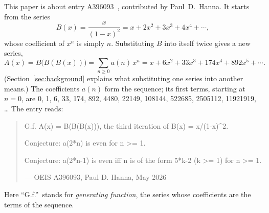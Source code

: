 \documentclass[11pt,a4paper]{article}
\theoremstyle{definition}
\theoremstyle{remark}
\begin{document}
This paper is about entry A396093~\cite{oeis}, contributed by Paul~D.~Hanna. It starts from the series
\[
B(x)=\frac{x}{(1-x)^2}=x+2x^2+3x^3+4x^4+\cdots,
\]
whose coefficient of $x^n$ is simply $n$. Substituting $B$ into itself twice gives a new series,
\[
A(x)=B\bigl(B(B(x))\bigr)=\sum_{n\ge0}a(n)\,x^n=x+6x^2+33x^3+174x^4+892x^5+\cdots .
\]
(Section~\ref{sec:background} explains what substituting one series into another means.) The coefficients $a(n)$ form
the sequence; its first terms, starting at $n=0$, are 0, 1, 6, 33, 174, 892, 4480, 22149, 108144, 522685, 2505112, 11921919, \dots{} The entry reads:
\begin{quote}\small\ttfamily\raggedright G.f. A(x) = B(B(B(x))), the third iteration of B(x) = x/(1-x)\^{}2.\par\smallskip Conjecture: a(2*n) is even for n >= 1.\par\smallskip Conjecture: a(2*n-1) is even iff n is of the form 5*k-2 (k >= 1) for n >= 1.\par\smallskip\hfill\textrm{--- OEIS A396093, Paul D. Hanna, May 2026}\end{quote}

Here ``G.f.''\ stands for \emph{generating function}, the series whose coefficients are the terms of the sequence.
\end{document}
